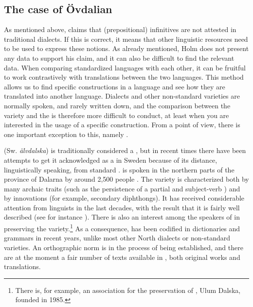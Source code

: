\documentclass[output=paper]{langscibook}
\begin{document}
\subsection{The case of Övdalian}\label{sec:kalm:4.3}


As mentioned above, \citet[27]{Holm1967} claims that  (prepositional) infinitives are not attested in traditional dialects. If this is correct, it means that other linguistic resources need to be used to express these  notions. As already mentioned, Holm does not present any data to support his claim, and it can also be difficult to find the relevant data. When comparing standardized languages with each other, it can be fruitful to work contrastively with translations between the two languages. This method allows us to find specific constructions in a language and see how they are translated into another language. Dialects and other non-standard varieties are normally spoken, and rarely written down, and the comparison between the variety and the  is therefore more difficult to conduct, at least when you are interested in the usage of a specific construction. From a  point of view, there is one important exception to this, namely . 

 (Sw. \textit{älvdalska}) is traditionally considered a  , but in recent times there have been attempts to get it acknowledged as a  in Sweden because of its distance, linguistically speaking, from standard .  is spoken in the northern parts of the province of Dalarna by around 2,500 people \citep[27]{Garbacz2009}. The variety is characterized both by many archaic traits (such as the persistence of a partial  and subject-verb ) and by innovations (for example, secondary diphthongs). It has received considerable attention from linguists in the last decades, with the result that it is fairly well described (see for instance \citealt{Garbacz2009,BentzenEtAl2015}). There is also an interest among the speakers of  in preserving the variety.\footnote{There is, for example, an association for the preservation of , Ulum Dalska, founded in 1985.} As a consequence,  has been codified in dictionaries and grammars in recent years, unlike most other North  dialects or non-standard varieties. An orthographic norm is in the process of being established, and there are at the moment a fair number of texts available in , both original works and translations. 
\end{document}
